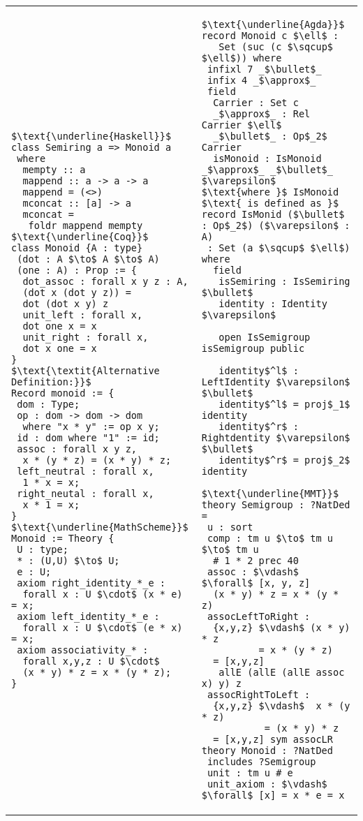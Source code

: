 \footnotesize
\begin{tabular}{p{6.3cm} p{7cm}}
\begin{lstlisting}[mathescape]
$\text{\underline{Haskell}}$
class Semiring a => Monoid a 
 where 
  mempty :: a 
  mappend :: a -> a -> a 
  mappend = (<>) 
  mconcat :: [a] -> a 
  mconcat = 
   foldr mappend mempty 
$\text{\underline{Coq}}$
class Monoid {A : type}
 (dot : A $\to$ A $\to$ A)
 (one : A) : Prop := {
  dot_assoc : forall x y z : A, 
  (dot x (dot y z)) = 
  dot (dot x y) z
  unit_left : forall x, 
  dot one x = x 
  unit_right : forall x, 
  dot x one = x              
}
$\text{\textit{Alternative Definition:}}$
Record monoid := {
 dom : Type; 
 op : dom -> dom -> dom 
  where "x * y" := op x y; 
 id : dom where "1" := id; 
 assoc : forall x y z, 
  x * (y * z) = (x * y) * z; 
 left_neutral : forall x,   
  1 * x = x; 
 right_neutal : forall x,
  x * 1 = x; 
}
$\text{\underline{MathScheme}}$
Monoid := Theory { 
 U : type; 
 * : (U,U) $\to$ U; 
 e : U; 
 axiom right_identity_*_e : 
  forall x : U $\cdot$ (x * e) = x;
 axiom left_identity_*_e :  
  forall x : U $\cdot$ (e * x) = x;
 axiom associativity_* : 
  forall x,y,z : U $\cdot$ 
  (x * y) * z = x * (y * z); 
}
\end{lstlisting}
&
\begin{lstlisting}[mathescape]
$\text{\underline{Agda}}$
record Monoid c $\ell$ : 
   Set (suc (c $\sqcup$ $\ell$)) where 
 infixl 7 _$\bullet$_
 infix 4 _$\approx$_
 field 
  Carrier : Set c 
  _$\approx$_ : Rel Carrier $\ell$ 
  _$\bullet$_ : Op$_2$ Carrier 
  isMonoid : IsMonoid _$\approx$_ _$\bullet$_ $\varepsilon$ 
$\text{where }$ IsMonoid $\text{ is defined as }$
record IsMonid ($\bullet$ : Op$_2$) ($\varepsilon$ : A) 
 : Set (a $\sqcup$ $\ell$) where 
  field 
   isSemiring : IsSemiring $\bullet$ 
   identity : Identity $\varepsilon$ 
       
   open IsSemigroup isSemigroup public 
   
   identity$^l$ : LeftIdentity $\varepsilon$ $\bullet$ 
   identity$^l$ = proj$_1$ identity 
   identity$^r$ : Rightdentity $\varepsilon$ $\bullet$ 
   identity$^r$ = proj$_2$ identity           

$\text{\underline{MMT}}$
theory Semigroup : ?NatDed = 
 u : sort 
 comp : tm u $\to$ tm u $\to$ tm u 
  # 1 * 2 prec 40
 assoc : $\vdash$ $\forall$ [x, y, z]
  (x * y) * z = x * (y * z)    
 assocLeftToRight : 
  {x,y,z} $\vdash$ (x * y) * z 
          = x * (y * z) 
  = [x,y,z] 
   allE (allE (allE assoc x) y) z
 assocRightToLeft : 
  {x,y,z} $\vdash$  x * (y * z) 
           = (x * y) * z 
  = [x,y,z] sym assocLR 
theory Monoid : ?NatDed 
 includes ?Semigroup 
 unit : tm u # e 
 unit_axiom : $\vdash$ $\forall$ [x] = x * e = x       
\end{lstlisting}       
\end{tabular}  
